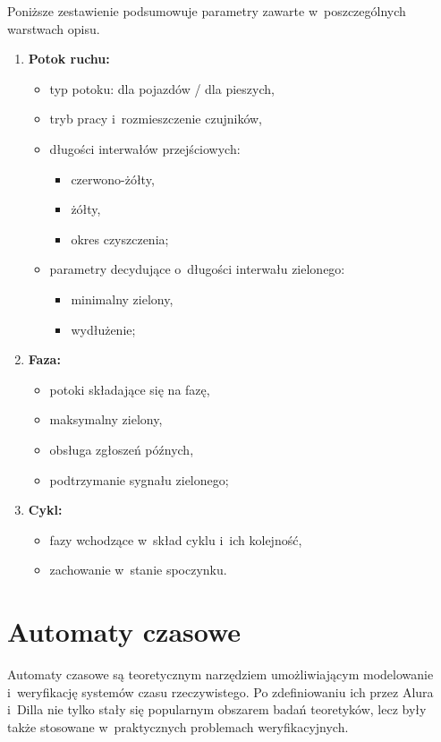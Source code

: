 \documentclass{pracamgr}
\theoremstyle{plain}
\begin{document}
Poniższe zestawienie podsumowuje parametry zawarte w~poszczególnych
warstwach opisu.
\begin{enumerate}
  \item \textbf{Potok ruchu:}
  \begin{itemize}
    \item typ potoku: dla pojazdów / dla pieszych,
    \item tryb pracy i~rozmieszczenie czujników,
    \item długości interwałów przejściowych:
    \begin{itemize}
      \item czerwono-żółty,
      \item żółty,
      \item okres czyszczenia;
    \end{itemize}
    \item parametry decydujące o~długości interwału zielonego:
    \begin{itemize}
      \item minimalny zielony,
      \item wydłużenie;
    \end{itemize}
  \end{itemize}
  \item \textbf{Faza:}
  \begin{itemize}
    \item potoki składające się na fazę,
    \item maksymalny zielony,
    \item obsługa zgłoszeń późnych,
    \item podtrzymanie sygnału zielonego;
  \end{itemize}
  \item \textbf{Cykl:}
  \begin{itemize}
    \item fazy wchodzące w~skład cyklu i~ich kolejność,
    \item zachowanie w~stanie spoczynku.
  \end{itemize}
\end{enumerate}

\chapter{Automaty czasowe}
\label{c:ta}
Automaty czasowe są teoretycznym narzędziem umożliwiającym modelowanie
i~weryfikację systemów czasu rzeczywistego. Po zdefiniowaniu ich przez
Alura i~Dilla \cite{alur-dill} nie tylko stały się popularnym obszarem
badań teoretyków, lecz były także stosowane w~praktycznych problemach
weryfikacyjnych.
\end{document}
